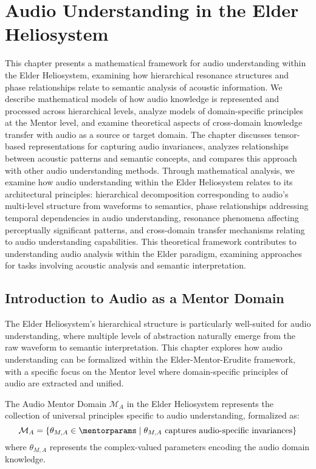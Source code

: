 \chapter{Audio Understanding in the Elder Heliosystem}

\begin{tcolorbox}[colback=PureBlue!5!white,colframe=PureBlue!75!black,title=Chapter Summary]
This chapter presents a mathematical framework for audio understanding within the Elder Heliosystem, examining how hierarchical resonance structures and phase relationships relate to semantic analysis of acoustic information. We describe mathematical models of how audio knowledge is represented and processed across hierarchical levels, analyze models of domain-specific principles at the Mentor level, and examine theoretical aspects of cross-domain knowledge transfer with audio as a source or target domain. The chapter discusses tensor-based representations for capturing audio invariances, analyzes relationships between acoustic patterns and semantic concepts, and compares this approach with other audio understanding methods. Through mathematical analysis, we examine how audio understanding within the Elder Heliosystem relates to its architectural principles: hierarchical decomposition corresponding to audio's multi-level structure from waveforms to semantics, phase relationships addressing temporal dependencies in audio understanding, resonance phenomena affecting perceptually significant patterns, and cross-domain transfer mechanisms relating to audio understanding capabilities. This theoretical framework contributes to understanding audio analysis within the Elder paradigm, examining approaches for tasks involving acoustic analysis and semantic interpretation.
\end{tcolorbox}

\section{Introduction to Audio as a Mentor Domain}

The Elder Heliosystem's hierarchical structure is particularly well-suited for audio understanding, where multiple levels of abstraction naturally emerge from the raw waveform to semantic interpretation. This chapter explores how audio understanding can be formalized within the Elder-Mentor-Erudite framework, with a specific focus on the Mentor level where domain-specific principles of audio are extracted and unified.

\begin{definition}
The Audio Mentor Domain $\mathcal{M}_A$ in the Elder Heliosystem represents the collection of universal principles specific to audio understanding, formalized as:
\begin{equation}
\mathcal{M}_A = \{\theta_{M,A} \in \mentorparams \mid \theta_{M,A} \text{ captures audio-specific invariances}\}
\end{equation}
where $\theta_{M,A}$ represents the complex-valued parameters encoding the audio domain knowledge.
\end{definition}

